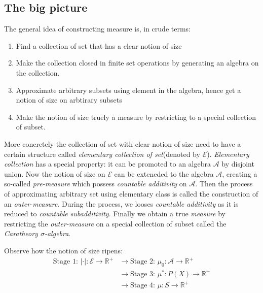 \documentclass[a4paper,11pt,oneside]{book}
\begin{document}
\subsection{The big picture}

The general idea of constructing measure is, in crude terms:

\begin{enumerate}
\item Find a collection of set that has a clear notion of size
\item Make the collection closed in finite set operations by generating an algebra on the collection.
\item Approximate arbitrary subsets using element in the algebra, hence get a notion of size on arbtirary subsets
\item Make the notion of size truely a measure by restricting to a special collection of subset.
\end{enumerate}

More concretely the collection of set with clear notion of size need to have a certain structure called \textit{elementary collection of set}(denoted by $\mathcal E$).  \textit{Elementary collection} has a special property: it can be promoted to an algebra $\mathcal A$ by disjoint union. Now the notion of size on $\mathcal E$ can be exteneded to the algebra $\mathcal A$, creating a so-called \textit{pre-measure} which possess \textit{countable additivity} on $\mathcal A$. Then the process of approximating arbitrary set using elementary class
is called the construction of an \textit{outer-measure}. During the process, we looses \textit{countable additivity} as it is reduced to \textit{countable subadditivity}. Finally we obtain a true \textit{measure} by restricting the \textit{outer-measure} on a special collection of subset called the \textit{Caratheory $\sigma$-algebra}.

Observe how the notion of size ripens:
\begin{equation}
\begin{aligned}
\text{Stage 1: $\boxed{|\cdot|:\mathcal E \to \mathbb{R}^+}$} 
&\longrightarrow \text{Stage 2: $\boxed{\mu_0: \mathcal A \to  \mathbb{R}^+}$} \\ 
&\longrightarrow \text{Stage 3: $\boxed{\mu^* : P(X)\to \mathbb{R}^+}$} \\ 
&\longrightarrow \text{Stage 4: $\boxed{\mu: S \to \mathbb{R}^{+}}$}
\end{aligned}
\end{equation}
\end{document}
